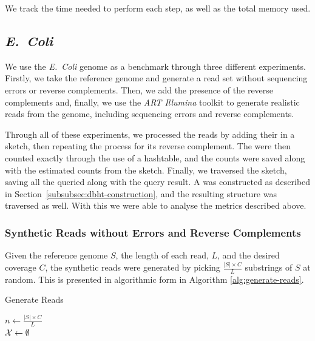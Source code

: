 We track the time needed to perform each step, as well as the total memory used.

\subsection{\emph{E.~Coli}}

We use the \emph{E.~Coli} genome \cite{ecoligenome}  as a benchmark through three different experiments. Firstly, we take the reference genome and generate a read set \readset without sequencing errors or reverse complements. Then, we add the presence of the reverse complements and, finally, we use the \emph{ART Illumina} toolkit \cite{Huang2011} to generate realistic reads from the genome, including sequencing errors and reverse complements.

Through all of these experiments, we processed the reads by adding their  in a \dBCM sketch, then repeating the process for its reverse complement. The  were then counted exactly through the use of a hashtable, and the counts were saved along with the estimated counts from the sketch. Finally, we traversed the sketch, saving all the queried  along with the query result. A \dBHT was constructed as described in Section~\ref{subsubsec:dbht-construction}, and the resulting structure was traversed as well. With this we were able to analyse the metrics described above.

\subsubsection{Synthetic Reads without Errors and Reverse Complements}

Given the reference genome $S$, the length of each read, $L$, and the desired coverage $C$, the synthetic reads were generated by picking
$\frac{|S| \times C}{L}$ substrings of $S$ at random. This is presented in algorithmic form in Algorithm \ref{alg:generate-reads}.

\begin{algorithm}
  \caption{Generate Reads}\label{alg:generate-reads}
  $n \gets \frac{|S| \times C}{L}$\\
  $\readset \gets \emptyset$\\
  \Return{$\readset$}
\end{algorithm}


